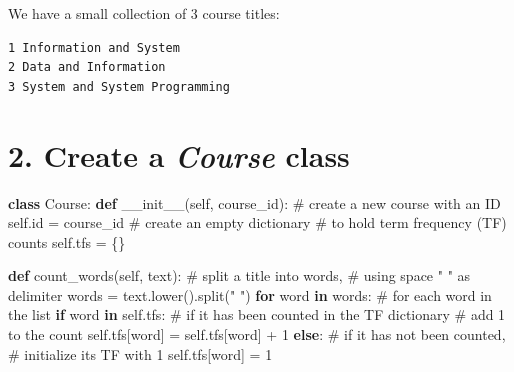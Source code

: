 \documentclass[
  letterpaper,
]{scrbook}
\newenvironment{Shaded}{\begin{snugshade}}{\end{snugshade}}
\newcommand{\BuiltInTok}[1]{\textcolor[rgb]{0.00,0.23,0.31}{#1}}
\newcommand{\CommentTok}[1]{\textcolor[rgb]{0.37,0.37,0.37}{#1}}
\newcommand{\ControlFlowTok}[1]{\textcolor[rgb]{0.00,0.23,0.31}{\textbf{#1}}}
\newcommand{\DecValTok}[1]{\textcolor[rgb]{0.68,0.00,0.00}{#1}}
\newcommand{\FunctionTok}[1]{\textcolor[rgb]{0.28,0.35,0.67}{#1}}
\newcommand{\KeywordTok}[1]{\textcolor[rgb]{0.00,0.23,0.31}{\textbf{#1}}}
\newcommand{\NormalTok}[1]{\textcolor[rgb]{0.00,0.23,0.31}{#1}}
\newcommand{\OperatorTok}[1]{\textcolor[rgb]{0.37,0.37,0.37}{#1}}
\newcommand{\StringTok}[1]{\textcolor[rgb]{0.13,0.47,0.30}{#1}}
\newcommand{\VariableTok}[1]{\textcolor[rgb]{0.07,0.07,0.07}{#1}}
\begin{document}

We have a small collection of 3 course titles:

\begin{verbatim}
1 Information and System
2 Data and Information
3 System and System Programming
\end{verbatim}

\section*{\texorpdfstring{2. Create a \emph{Course}
class}{2. Create a Course class}}\label{create-a-course-class}


\begin{Shaded}
\begin{Highlighting}[]
\KeywordTok{class}\NormalTok{ Course: }
    \KeywordTok{def} \FunctionTok{\_\_init\_\_}\NormalTok{(}\VariableTok{self}\NormalTok{, course\_id):}
        \CommentTok{\# create a new course with an ID}
        \VariableTok{self}\NormalTok{.}\BuiltInTok{id} \OperatorTok{=}\NormalTok{ course\_id}
        \CommentTok{\# create an empty dictionary }
        \CommentTok{\# to hold term frequency (TF) counts}
        \VariableTok{self}\NormalTok{.tfs }\OperatorTok{=}\NormalTok{ \{\}}
    
    \KeywordTok{def}\NormalTok{ count\_words(}\VariableTok{self}\NormalTok{, text):}
        \CommentTok{\# split a title into words, }
        \CommentTok{\# using space " " as delimiter}
\NormalTok{        words }\OperatorTok{=}\NormalTok{ text.lower().split(}\StringTok{" "}\NormalTok{)}
        \ControlFlowTok{for}\NormalTok{ word }\KeywordTok{in}\NormalTok{ words: }
            \CommentTok{\# for each word in the list}
            \ControlFlowTok{if}\NormalTok{ word }\KeywordTok{in} \VariableTok{self}\NormalTok{.tfs: }
                \CommentTok{\# if it has been counted in the TF dictionary}
                \CommentTok{\# add 1 to the count}
                \VariableTok{self}\NormalTok{.tfs[word] }\OperatorTok{=} \VariableTok{self}\NormalTok{.tfs[word] }\OperatorTok{+} \DecValTok{1}
            \ControlFlowTok{else}\NormalTok{:}
                \CommentTok{\# if it has not been counted, }
                \CommentTok{\# initialize its TF with 1}
                \VariableTok{self}\NormalTok{.tfs[word] }\OperatorTok{=} \DecValTok{1}
\end{Highlighting}
\end{Shaded}
\end{document}
